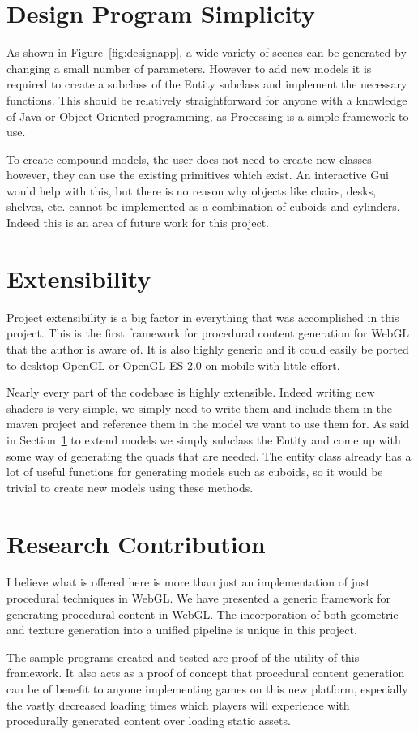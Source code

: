 \section{Design Program Simplicity}
\label{sec:designsimplicity}
As shown in Figure~\ref{fig:designapp}, a wide variety of scenes can be generated by changing a small number of parameters.
However to add new models it is required to create a subclass of the Entity subclass and implement the necessary functions.
This should be relatively straightforward for anyone with a knowledge of Java or Object Oriented programming, as Processing is a simple framework to use.

To create compound models, the user does not need to create new classes however, they can use the existing primitives which exist.
An interactive Gui would help with this, but there is no reason why objects like chairs, desks, shelves, etc. cannot be implemented as a combination of cuboids and cylinders.
Indeed this is an area of future work for this project.

\section{Extensibility}
Project extensibility is a big factor in everything that was accomplished in this project.
This is the first framework for procedural content generation for WebGL that the author is aware of.
It is also highly generic and it could easily be ported to desktop OpenGL or OpenGL ES 2.0 on mobile with little effort.

Nearly every part of the codebase is highly extensible.
Indeed writing new shaders is very simple, we simply need to write them and include them in the maven project and reference them in the model we want to use them for.
As said in Section~\ref{sec:designsimplicity} to extend models we simply subclass the Entity and come up with some way of generating the quads that are needed.
The entity class already has a lot of useful functions for generating models such as cuboids, so it would be trivial to create new models using these methods.

\section{Research Contribution}
I believe what is offered here is more than just an implementation of just procedural techniques in WebGL.
We have presented a generic framework for generating procedural content in WebGL.
The incorporation of both geometric and texture generation into a unified pipeline is unique in this project.

The sample programs created and tested are proof of the utility of this framework.
It also acts as a proof of concept that procedural content generation can be of benefit to anyone implementing games on this new platform, especially the vastly decreased loading times which players will experience with procedurally generated content over loading static assets.
